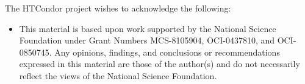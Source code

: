 \begin{itemize}
\end{itemize}

The HTCondor project wishes to acknowledge the following:

\begin{itemize}

\item This material is based upon work supported by the 
National Science Foundation under Grant Numbers
MCS-8105904, OCI-0437810, and OCI-0850745. 
Any opinions, findings, and conclusions or recommendations expressed 
in this material are those of the author(s) and do not necessarily 
reflect the views of the National Science Foundation.

\end{itemize}

